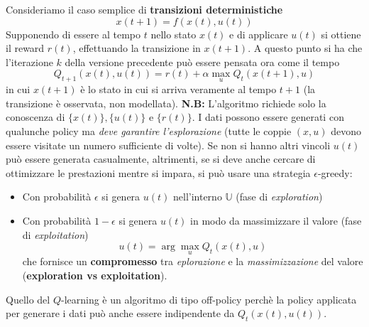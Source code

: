Consideriamo il caso semplice di \textbf{transizioni deterministiche}
\begin{equation}
x(t+1) = f(x(t), u(t))
\end{equation} Supponendo di essere al tempo $t$ nello stato $x(t)$ e di applicare $u(t)$ si ottiene il reward $r(t)$, effettuando la transizione in $x(t+1)$. A questo punto si ha che l'iterazione $k$ della versione precedente pu\`o essere pensata ora come il tempo
\begin{equation}
Q_{t+1} (x(t), u(t)) = r(t) + \alpha \max_{u} Q_t (x(t+1), u)
\end{equation} in cui $x(t+1)$ \`e lo stato in cui si arriva veramente al tempo $t+1$ (la transizione \`e osservata, non modellata).
\textbf{N.B:} L'algoritmo richiede solo la conoscenza di $\{x(t)\}, \{u(t)\}$ e $\{r(t)\}$. I dati possono essere generati con qualunche policy ma \textit{deve garantire l'esplorazione} (tutte le coppie $(x,u)$ devono essere visitate un numero sufficiente di volte). Se non si hanno altri vincoli $u(t)$ pu\`o essere generata casualmente, altrimenti, se si deve anche cercare di ottimizzare le prestazioni mentre si impara, si pu\`o usare una strategia $\epsilon$-greedy:
\begin{itemize}
\item Con probabilit\`a $\epsilon$ si genera $u(t)$ nell'interno $\mathbb{U}$ (fase di \textit{exploration})
\item Con probabilit\`a $1-\epsilon$ si genera $u(t)$ in modo da massimizzare il valore (fase di \textit{exploitation})
\begin{equation}
u(t) = \arg \max_u Q_t (x(t), u)
\end{equation} che fornisce un \textbf{compromesso} tra \textit{eplorazione} e la \textit{massimizzazione} del valore (\textbf{exploration vs exploitation}).
\end{itemize}
Quello del $Q$-learning \`e un algoritmo di tipo off-policy perch\`e la policy applicata per generare i dati pu\`o anche essere indipendente da $Q_t(x(t), u(t))$.

